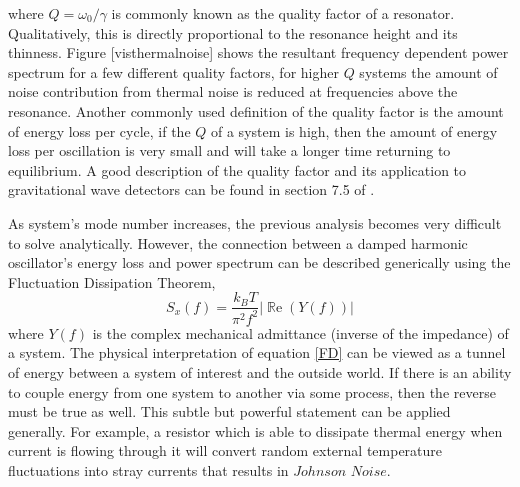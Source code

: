 		where $Q=\omega_{0}/\gamma$ is commonly known as the quality factor of a resonator.  Qualitatively, this is directly proportional to the resonance height and its thinness.  Figure [visthermalnoise] shows the resultant frequency dependent power spectrum for a few different quality factors, for higher $Q$ systems the amount of noise contribution from thermal noise is reduced at frequencies above the resonance.  Another commonly used definition of the quality factor is the amount of energy loss per cycle, if the $Q$ of a system is high, then the amount of energy loss per oscillation is very small and will take a longer time returning to equilibrium.  A good description of the quality factor and its application to gravitational wave detectors can be found in section 7.5 of \cite{Saulson}.
		
		As system's mode number increases, the previous analysis becomes very difficult to solve analytically. However, the connection between a damped harmonic oscillator's energy loss and power spectrum can be described generically using the Fluctuation Dissipation Theorem,
		\begin{equation}\label{FD}
		S_x(f) = \frac{k_B T}{\pi^2 f^2} \vert \operatorname{\mathbb{R}e} (Y(f)) \vert
		\end{equation}
		where $Y(f)$ is the complex mechanical admittance (inverse of the impedance) of a system. The physical interpretation of equation \ref{FD} can be viewed as a tunnel of energy between a system of interest and the outside world.  If there is an ability to couple energy from one system to another via some process, then the reverse must be true as well. This subtle but powerful statement can be applied generally.  For example, a resistor which is able to dissipate thermal energy when current is flowing through it will convert random external temperature fluctuations into stray currents that results in $Johnson$ $Noise$.
		
